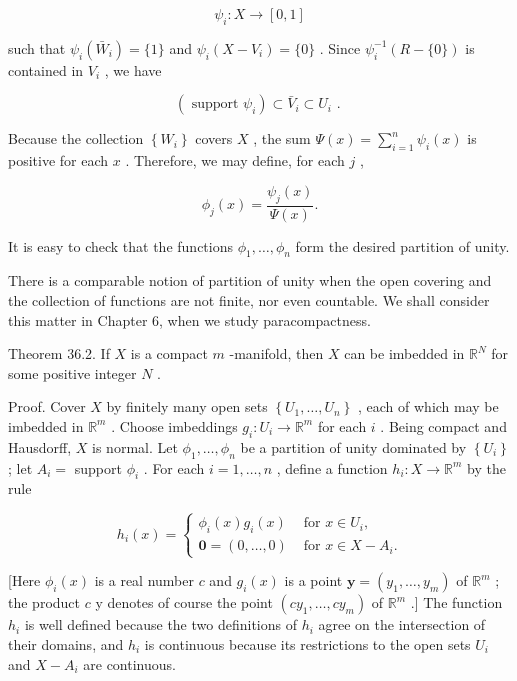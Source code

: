 \[
{\psi }_{i} : X \rightarrow  \left\lbrack  {0,1}\right\rbrack
\]

such that \({\psi }_{i}\left( {\bar{W}}_{i}\right)  = \{ 1\}\) and \({\psi }_{i}\left( {X - {V}_{i}}\right)  = \{ 0\}\) . Since \({\psi }_{i}^{-1}\left( {R-\{ 0\} }\right)\) is contained in \({V}_{i}\) , we have

\[
\left( {\text{ support }{\psi }_{i}}\right)  \subset  {\bar{V}}_{i} \subset  {U}_{i}\text{ . }
\]

Because the collection \(\left\{  {W}_{i}\right\}\) covers \(X\) , the sum \(\Psi \left( x\right)  = \mathop{\sum }\limits_{{i = 1}}^{n}{\psi }_{i}\left( x\right)\) is positive for each \(x\) . Therefore, we may define, for each \(j\) ,

\[
{\phi }_{j}\left( x\right)  = \frac{{\psi }_{j}\left( x\right) }{\Psi \left( x\right) }.
\]

It is easy to check that the functions \({\phi }_{1},\ldots ,{\phi }_{n}\) form the desired partition of unity.

There is a comparable notion of partition of unity when the open covering and the collection of functions are not finite, nor even countable. We shall consider this matter in Chapter 6, when we study paracompactness.

Theorem 36.2. If \(X\) is a compact \(m\) -manifold, then \(X\) can be imbedded in \({\mathbb{R}}^{N}\) for some positive integer \(N\) .

Proof. Cover \(X\) by finitely many open sets \(\left\{  {{U}_{1},\ldots ,{U}_{n}}\right\}\) , each of which may be imbedded in \({\mathbb{R}}^{m}\) . Choose imbeddings \({g}_{i} : {U}_{i} \rightarrow  {\mathbb{R}}^{m}\) for each \(i\) . Being compact and Hausdorff, \(X\) is normal. Let \({\phi }_{1},\ldots ,{\phi }_{n}\) be a partition of unity dominated by \(\left\{  {U}_{i}\right\}\) ; let \({A}_{i} =\) support \({\phi }_{i}\) . For each \(i = 1,\ldots ,n\) , define a function \({h}_{i} : X \rightarrow  {\mathbb{R}}^{m}\) by the rule

\[
{h}_{i}\left( x\right)  = \left\{  \begin{array}{ll} {\phi }_{i}\left( x\right) {g}_{i}\left( x\right) & \text{ for }x \in  {U}_{i}, \\  \mathbf{0} = \left( {0,\ldots ,0}\right) & \text{ for }x \in  X - {A}_{i}. \end{array}\right.
\]

[Here \({\phi }_{i}\left( x\right)\) is a real number \(c\) and \({g}_{i}\left( x\right)\) is a point \(\mathbf{y} = \left( {{y}_{1},\ldots ,{y}_{m}}\right)\) of \({\mathbb{R}}^{m}\) ; the product \(c\) y denotes of course the point \(\left( {c{y}_{1},\ldots ,c{y}_{m}}\right)\) of \({\mathbb{R}}^{m}\) .] The function \({h}_{i}\) is well defined because the two definitions of \({h}_{i}\) agree on the intersection of their domains, and \({h}_{i}\) is continuous because its restrictions to the open sets \({U}_{i}\) and \(X - {A}_{i}\) are continuous.

